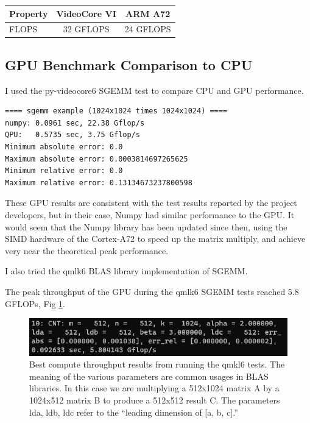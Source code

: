 \documentclass[12pt]{article}
\begin{document}
\begin{center}
\begin{tabular}{|l|c|c|}
\hline
Property & VideoCore VI & ARM A72 \\
\hline
FLOPS & 32 GFLOPS & 24 GFLOPS \\
\hline
\end{tabular}
\end{center}

\subsection{GPU Benchmark Comparison to CPU}
I used the py-videocore6 SGEMM test to compare CPU and GPU performance.

\begin{lstlisting}
==== sgemm example (1024x1024 times 1024x1024) ====
numpy: 0.0961 sec, 22.38 Gflop/s
QPU:   0.5735 sec, 3.75 Gflop/s
Minimum absolute error: 0.0
Maximum absolute error: 0.0003814697265625
Minimum relative error: 0.0
Maximum relative error: 0.13134673237800598
\end{lstlisting}

These GPU results are consistent with the test results reported by the project developers, but in their case, Numpy had similar performance to the GPU. It would seem that the Numpy library has been updated since then, using the SIMD hardware of the Cortex-A72 to speed up the matrix multiply, and achieve very near the theoretical peak performance.

I also tried the qmlk6 BLAS library implementation of SGEMM.

The peak throughput of the GPU during the qmlk6 SGEMM tests reached 5.8 GFLOPs, Fig \ref{fig:qpu_blas}. 

\begin{figure}[h]
\centering
\includegraphics[width=1.0\textwidth]{QPU_BLAS_Peak.png} %
\caption{Best compute throughput results from running the qmkl6 tests. The meaning of the various parameters are common usages in BLAS libraries. In this case we are multiplying a 512x1024 matrix A by a 1024x512 matrix B to produce a 512x512 result C. The parameters lda, ldb, ldc refer to the ``leading dimension of [a, b, c].''}
\label{fig:qpu_blas}
\end{figure}
\end{document}
